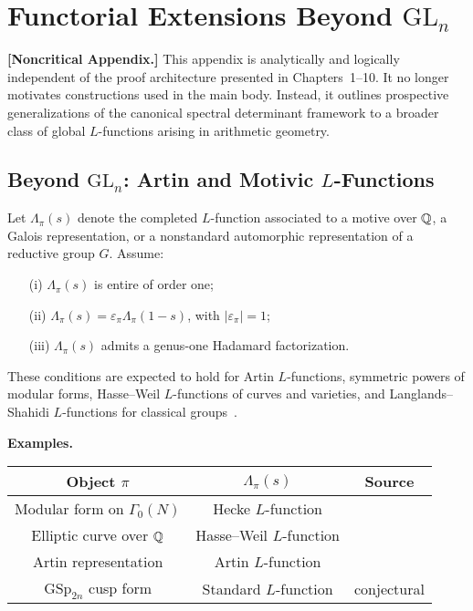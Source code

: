 \section{Functorial Extensions Beyond \texorpdfstring{$\mathrm{GL}_n$}{GLn}}
\label{app:functorial_extensions}

\noindent\textbf{[Noncritical Appendix.]}  
This appendix is analytically and logically independent of the proof architecture presented in Chapters~1–10. It no longer motivates constructions used in the main body. Instead, it outlines prospective generalizations of the canonical spectral determinant framework to a broader class of global \( L \)-functions arising in arithmetic geometry.

\subsection*{Beyond \texorpdfstring{$\mathrm{GL}_n$}{GLn}: Artin and Motivic \( L \)-Functions}

Let \( \Lambda_\pi(s) \) denote the completed \( L \)-function associated to a motive over \( \mathbb{Q} \), a Galois representation, or a nonstandard automorphic representation of a reductive group \( G \). Assume:

\begin{itemize}
  \item[(i)] \( \Lambda_\pi(s) \) is entire of order one;
  \item[(ii)] \( \Lambda_\pi(s) = \varepsilon_\pi \Lambda_\pi(1 - s) \), with \( |\varepsilon_\pi| = 1 \);
  \item[(iii)] \( \Lambda_\pi(s) \) admits a genus-one Hadamard factorization.
\end{itemize}

These conditions are expected to hold for Artin \( L \)-functions, symmetric powers of modular forms, Hasse–Weil \( L \)-functions of curves and varieties, and Langlands–Shahidi \( L \)-functions for classical groups~\cite{Langlands1970EulerProducts, Deligne1971WeilI}.

\medskip
\noindent\textbf{Examples.}
\begin{center}
\renewcommand{\arraystretch}{1.3}
\begin{tabular}{|c|c|c|}
\hline
\textbf{Object \( \pi \)} & \textbf{\( \Lambda_\pi(s) \)} & \textbf{Source} \\
\hline
Modular form on \( \Gamma_0(N) \) & Hecke \( L \)-function & \cite{Cogdell2007Lectures} \\
Elliptic curve over \( \mathbb{Q} \) & Hasse–Weil \( L \)-function & \cite{Deligne1971WeilI} \\
Artin representation & Artin \( L \)-function & \cite{Langlands1970EulerProducts} \\
\( \mathrm{GSp}_{2n} \) cusp form & Standard \( L \)-function & conjectural \\
\hline
\end{tabular}
\end{center}

